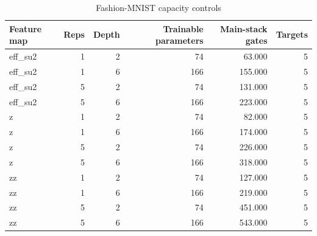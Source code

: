 \begin{table}
\caption{Fashion-MNIST capacity controls}
\label{tab:satml_fashion_capacity}
\begin{tabular}{lrrrrr}
\toprule
Feature map & Reps & Depth & Trainable parameters & Main-stack gates & Targets \\
\midrule
eff\_su2 & 1 & 2 & 74 & 63.000 & 5 \\
eff\_su2 & 1 & 6 & 166 & 155.000 & 5 \\
eff\_su2 & 5 & 2 & 74 & 131.000 & 5 \\
eff\_su2 & 5 & 6 & 166 & 223.000 & 5 \\
z & 1 & 2 & 74 & 82.000 & 5 \\
z & 1 & 6 & 166 & 174.000 & 5 \\
z & 5 & 2 & 74 & 226.000 & 5 \\
z & 5 & 6 & 166 & 318.000 & 5 \\
zz & 1 & 2 & 74 & 127.000 & 5 \\
zz & 1 & 6 & 166 & 219.000 & 5 \\
zz & 5 & 2 & 74 & 451.000 & 5 \\
zz & 5 & 6 & 166 & 543.000 & 5 \\
\bottomrule
\end{tabular}
\end{table}


